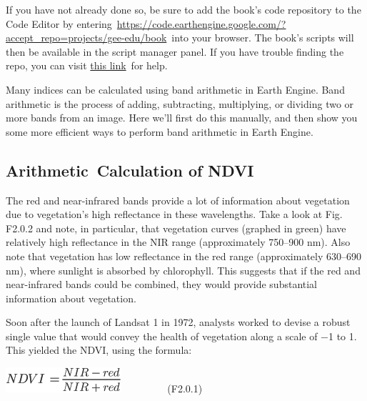 \documentclass[
  letterpaper,
  DIV=11,
  numbers=noendperiod]{scrreprt}
\begin{document}
If you have not already done so, be sure to add the book's code
repository to the Code Editor by
entering~\href{https://www.google.com/url?q=https://code.earthengine.google.com/?accept_repo\%3Dprojects/gee-edu/book\&sa=D\&source=editors\&ust=1671458829783542\&usg=AOvVaw2f8xfEZP6c0zP_Ke8jL26U}{}\href{https://www.google.com/url?q=https://code.earthengine.google.com/?accept_repo\%3Dprojects/gee-edu/book\&sa=D\&source=editors\&ust=1671458829783919\&usg=AOvVaw2i09J44MzpMZkjV_JLEnNR}{https://code.earthengine.google.com/?accept\_repo=projects/gee-edu/book}~into
your browser. The book's scripts will then be available in the script
manager panel. If you have trouble finding the repo, you can visit
\href{https://www.google.com/url?q=https://docs.google.com/presentation/d/1Kt6wGNoesYm__Cu3k3bnlbbyPN6m9SF4hQHK-pIDHfc/edit\%23slide\%3Did.g18a7b4b055d_0_624\&sa=D\&source=editors\&ust=1671458829784270\&usg=AOvVaw1Kr82KG60ZeFLYC8cOZ67A}{this
link}~for help.

Many indices can be calculated using band arithmetic in Earth Engine.
Band arithmetic is the process of adding, subtracting, multiplying, or
dividing two or more bands from an image. Here we'll first do this
manually, and then show you some more efficient ways to perform band
arithmetic in Earth Engine.

\hypertarget{arithmetic-calculation-of-ndvi}{%
\subsection{Arithmetic~Calculation of
NDVI}\label{arithmetic-calculation-of-ndvi}}

The red and near-infrared bands provide a lot of information about
vegetation due to vegetation's high reflectance in these wavelengths.
Take a look at Fig. F2.0.2 and note, in particular, that vegetation
curves (graphed in green) have relatively high reflectance in the NIR
range (approximately 750--900 nm). Also note that vegetation has low
reflectance in the red range (approximately 630--690 nm), where sunlight
is absorbed by chlorophyll. This suggests that if the red and
near-infrared bands could be combined, they would provide substantial
information about vegetation.

Soon after the launch of Landsat 1 in 1972, analysts worked to devise a
robust single value that would convey the health of vegetation along a
scale of −1 to 1. This yielded the NDVI, using the formula:

\includegraphics{./F2/image1.png}~ ~ ~ ~ ~ ~(F2.0.1)
\end{document}
